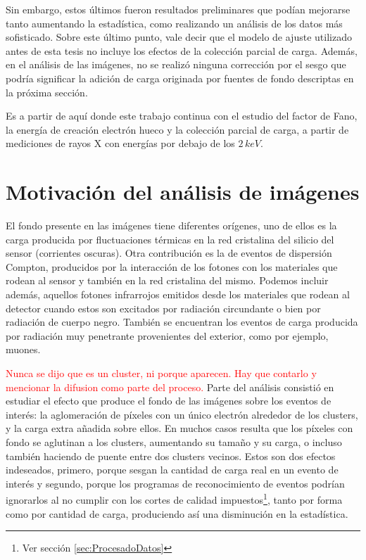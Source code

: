 Sin embargo, estos últimos fueron resultados preliminares que podían mejorarse tanto aumentando la estadística, como realizando un análisis de los datos más sofisticado. Sobre este último punto, vale decir que el modelo de ajuste utilizado antes de esta tesis no incluye los efectos de la colección parcial de carga. Además, en el análisis de las imágenes, no se realizó ninguna corrección por el sesgo que podría significar la adición de carga originada por fuentes de fondo descriptas en la próxima sección.

Es a partir de aquí donde este trabajo continua con el estudio del factor de Fano, la energía de creación electrón hueco y la colección parcial de carga, a partir de mediciones de rayos X con energías por debajo de los $2\,\si{keV}$.

\section{Motivación del análisis de imágenes}
\noindent El fondo presente en las imágenes tiene diferentes orígenes, uno de ellos es la carga producida por fluctuaciones térmicas en la red cristalina del silicio del sensor (corrientes oscuras). Otra contribución es la de eventos de dispersión Compton, producidos por la interacción de los fotones con los materiales que rodean al sensor y también en la red cristalina del mismo. Podemos incluir además, aquellos fotones infrarrojos emitidos desde los materiales que rodean al detector cuando estos son excitados por radiación circundante o bien por radiación de cuerpo negro. También se encuentran los eventos de carga producida por radiación muy penetrante provenientes del exterior, como por ejemplo, muones.

\textcolor{red}{Nunca se dijo que es un cluster, ni porque aparecen. Hay que contarlo y mencionar la difusion como parte del proceso.}
Parte del análisis consistió en estudiar el efecto que produce el fondo de las imágenes sobre los eventos de interés: la aglomeración de píxeles con un único electrón alrededor de los clusters, y la carga extra añadida sobre ellos. 
En muchos casos resulta que los píxeles con fondo se aglutinan a los clusters, aumentando su tamaño y su carga, o incluso también haciendo de puente entre dos clusters vecinos. Estos son dos efectos indeseados, primero, porque sesgan la cantidad de carga real en un evento de interés y segundo, porque los programas de reconocimiento de eventos podrían ignorarlos al no cumplir con los cortes de calidad impuestos\footnote{Ver sección \ref{sec:ProcesadoDatos}}, tanto por forma como por cantidad de carga, produciendo así una disminución en la estadística.

